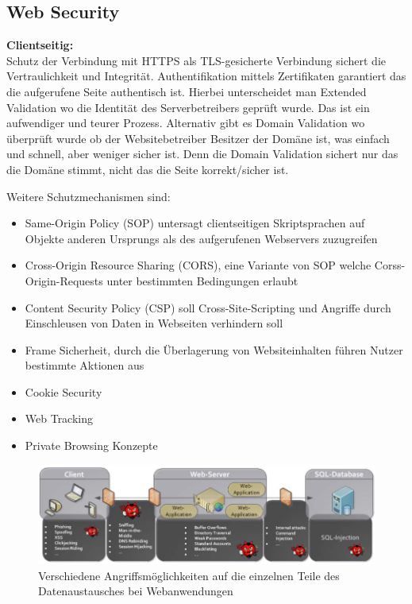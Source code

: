 \documentclass[a4paper,12pt,leqno]{article}
\begin{document}
\subsection{Web Security}


\textbf{Clientseitig:}\\
Schutz der Verbindung mit HTTPS als TLS-gesicherte Verbindung sichert die Vertraulichkeit und Integrität. Authentifikation mittels Zertifikaten garantiert das die aufgerufene Seite authentisch ist. Hierbei unterscheidet man Extended Validation wo die Identität des Serverbetreibers  geprüft wurde. Das ist ein aufwendiger und teurer Prozess. Alternativ gibt es Domain Validation wo überprüft wurde ob der Websitebetreiber Besitzer der Domäne ist, was einfach und schnell, aber weniger sicher ist. Denn die Domain Validation sichert nur das die Domäne stimmt, nicht das die Seite korrekt/sicher ist.

Weitere Schutzmechanismen sind:
\begin{itemize}
\item Same-Origin Policy (SOP) untersagt clientseitigen Skriptsprachen auf Objekte anderen Ursprungs als des aufgerufenen Webservers zuzugreifen
\item Cross-Origin Resource Sharing (CORS), eine Variante von SOP welche Corss-Origin-Requests unter bestimmten Bedingungen erlaubt
\item Content Security Policy (CSP) soll Cross-Site-Scripting und Angriffe durch Einschleusen von Daten in Webseiten verhindern soll
\item Frame Sicherheit, durch die Überlagerung von Websiteinhalten führen Nutzer bestimmte Aktionen aus
\item Cookie Security
\item Web Tracking
\item Private Browsing Konzepte
\end{itemize}

\begin{figure}[h!]
\centering
\includegraphics[scale=0.65]{Grafiken/AngriffeWebanwendung.png}
\caption{Verschiedene Angriffsmöglichkeiten auf die einzelnen Teile des Datenaustausches bei Webanwendungen}
\end{figure}
\end{document}
